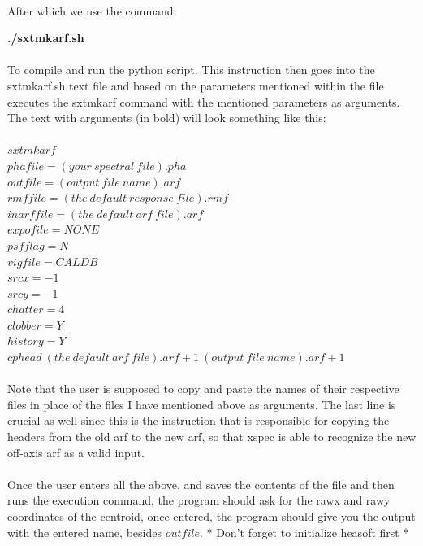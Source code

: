 \documentclass[a4paper,twoside]{report}
\numberwithin{equation}{section}
\begin{document}
\paragraph{}
After which we use the command:
\begin{center}
\item \large \textbf{./sxtmkarf.sh}
\end{center}
\paragraph{}
To compile and run the python script. This instruction then goes into the sxtmkarf.sh text file and based on the parameters mentioned within the file executes the sxtmkarf command with the mentioned parameters as arguments. The text with arguments (in bold) will look something like this:
\paragraph{}
$sxtmkarf$ \\$phafile=(your \ spectral \ file).pha $ \\$outfile=(output \ file \ name).arf$\\ 	$rmffile=(the \ default \ response \ file).rmf$ \\$inarffile=(the \ default \ arf \ file).arf$\\ $expofile=NONE$ \\ $psfflag=N$\\ $vigfile=CALDB$\\$srcx=-1$ \\$srcy=-1$ \\$chatter=4$\\ $clobber=Y$ \\$history=Y$\\ $cphead \ (the \ default \ arf \ file).arf+1 \ (output \ file \ name).arf+1$
\paragraph{}
Note that the user is supposed to copy and paste the names of their respective files in place of the files I have mentioned above as arguments. The last line is crucial as well since this is the instruction that is responsible for copying the headers from the old arf to the new arf, so that xspec is able to recognize the new off-axis arf as a valid input. 
\paragraph{}
Once the user enters all the above, and saves the contents of the file and then runs the execution command, the program should ask for the rawx and rawy coordinates of the centroid, once entered, the program should give you the output with the entered name, besides $outfile$. * Don't forget to initialize heasoft first *
\end{document}
